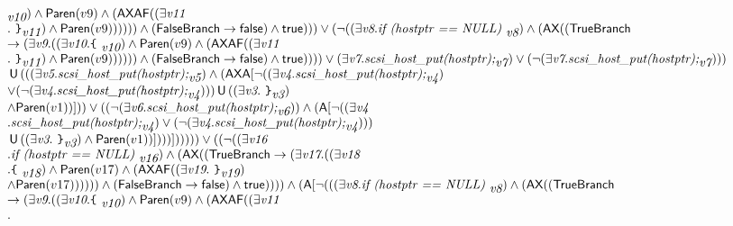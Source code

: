 \documentclass{article}
\newcommand{\U}{\,\mbox{\sf{U}}\,}
\newcommand{\A}{\mbox{\sf{A}}}
\newcommand{\AX}{\mbox{\sf{AX}}}
\newcommand{\AF}{\mbox{\sf{AF}}}
\newcommand{\mita}[1]{\mbox{\it{{#1}}}}
\newcommand{\msf}[1]{\mbox{\sf{{#1}}}}
\newcommand{\ttlb}{\mbox{\tt \char'173}}
\newcommand{\ttrb}{\mbox{\tt \char'175}}
\begin{document}
\[\begin{array}{l}
{  }_{\mita{v10}}) \wedge \msf{Paren}(v9) \wedge (\AX\AF((\exists \mita{v11}\\ . \mita{
{\ttrb}}_{\mita{v11}}) \wedge \msf{Paren}(v9)))))) \wedge (\msf{FalseBranch} \rightarrow \msf{false}) \wedge \msf{true}))) \vee (\neg ((\exists \mita{v8} . \mita{if (hostptr == NULL) }_{\mita{v8}}) \wedge (\AX((\msf{TrueBranch}\\ \rightarrow (\exists \mita{v9} . ((\exists \mita{v10} . \mita{{\ttlb}
  }_{\mita{v10}}) \wedge \msf{Paren}(v9) \wedge (\AX\AF((\exists \mita{v11}\\ . \mita{
{\ttrb}}_{\mita{v11}}) \wedge \msf{Paren}(v9)))))) \wedge (\msf{FalseBranch} \rightarrow \msf{false}) \wedge \msf{true})))) \vee (\exists \mita{v7} . \mita{scsi\_host\_put(hostptr);}_{\mita{v7}}) \vee (\neg (\exists \mita{v7} . \mita{scsi\_host\_put(hostptr);}_{\mita{v7}})))\\ \U (((\exists \mita{v5} . \mita{scsi\_host\_put(hostptr);}_{\mita{v5}}) \wedge (\AX\A[\neg ((\exists \mita{v4} . \mita{scsi\_host\_put(hostptr);}_{\mita{v4}})\\ \vee (\neg (\exists \mita{v4} . \mita{scsi\_host\_put(hostptr);}_{\mita{v4}}))) \U ((\exists \mita{v3} . \mita{
{\ttrb}}_{\mita{v3}})\\ \wedge \msf{Paren}(v1))]
)) \vee ((\neg (\exists \mita{v6} . \mita{scsi\_host\_put(hostptr);}_{\mita{v6}})) \wedge (\A[\neg ((\exists \mita{v4}\\ . \mita{scsi\_host\_put(hostptr);}_{\mita{v4}}) \vee (\neg (\exists \mita{v4} . \mita{scsi\_host\_put(hostptr);}_{\mita{v4}})))\\ \U ((\exists \mita{v3} . \mita{
{\ttrb}}_{\mita{v3}}) \wedge \msf{Paren}(v1))]
)))]
))))) \vee ((\neg ((\exists \mita{v16}\\ . \mita{if (hostptr == NULL) }_{\mita{v16}}) \wedge (\AX((\msf{TrueBranch} \rightarrow (\exists \mita{v17} . ((\exists \mita{v18}\\ . \mita{{\ttlb}
  }_{\mita{v18}}) \wedge \msf{Paren}(v17) \wedge (\AX\AF((\exists \mita{v19} . \mita{
{\ttrb}}_{\mita{v19}})\\ \wedge \msf{Paren}(v17)))))) \wedge (\msf{FalseBranch} \rightarrow \msf{false}) \wedge \msf{true})))) \wedge (\A[\neg (((\exists \mita{v8} . \mita{if (hostptr == NULL) }_{\mita{v8}}) \wedge (\AX((\msf{TrueBranch}\\ \rightarrow (\exists \mita{v9} . ((\exists \mita{v10} . \mita{{\ttlb}
  }_{\mita{v10}}) \wedge \msf{Paren}(v9) \wedge (\AX\AF((\exists \mita{v11}\\ . \mita{
}
\end{array}\]
\end{document}
